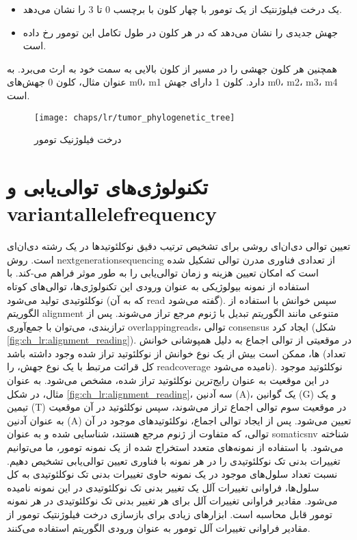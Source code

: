 \begin{itemize}
	\item یک درخت فیلوژنتیک از یک تومور با چهار کلون با برچسب 0 تا 3  را نشان می‌دهد.
	\item جهش جدیدی را نشان می‌دهد که در هر کلون در طول تکامل این تومور رخ داده است.
\end{itemize}

 همچنین هر کلون جهشی را در مسیر از کلون بالایی به سمت خود به ارث می‌برد. به عنوان مثال، کلون 0 جهش‌های m0، m1 دارد. کلون 1 دارای جهش m0، m2، m3، m4 است.
 
\begin{figure}[!ht]
	\centerline{\texttt{[image: chaps/lr/tumor\_phylogenetic\_tree]}}
	\caption{درخت فیلوژنیک تومور}
	\label{fig:ch_lr:tumor_phylogenetic_tree}
\end{figure}


\section{تکنولوژی‌های توالی‌یابی و \gls{variantallelefrequency}}




تعیین توالی دی‌ان‌ای روشی برای تشخیص ترتیب دقیق نوکلئوتیدها در یک رشته دی‌ان‌ای است. روش \gls{nextgenerationsequencing}  از تعدادی فناوری مدرن توالی تشکیل شده است که امکان تعیین هزینه و زمان توالی‌یابی را به طور موثر فراهم می-کند. با استفاده از نمونه بیولوژیکی به عنوان ورودی این تکنولوژی‌ها، توالی‌های کوتاه نوکلئوتیدی تولید می‌شود (که به آن \gls{read}  گفته می‌شود). سپس خوانش با استفاده از الگوریتم \gls{alignment}  متنوعی مانند الگوریتم تبدیل  با ژنوم مرجع تراز می‌شوند. پس از ترازبندی، می‌توان با جمع‌آوری \glspl{overlappingread}،  توالی \gls{consensus}  ایجاد کرد (شکل \ref{fig:ch_lr:alignment_reading}). در موقعیتی از توالی اجماع به دلیل همپوشانی خوانش ها، ممکن است بیش از یک نوع خوانش از نوکلئوتید تراز شده وجود داشته باشد (تعداد کل قرائت مرتبط با یک نوع جهش، را \gls{readcoverage}  نامیده می‌شود). نوکلئوتید موجود در این موقعیت به عنوان رایج‌ترین نوکلئوتید تراز شده، مشخص می‌شود. به عنوان مثال، در شکل \ref{fig:ch_lr:alignment_reading}، سه آدنین (A)، یک گوانین (G) و یک تیمین (T)  در موقعیت سوم توالی اجماع تراز می‌شوند، سپس نوکلئوتید در آن موقعیت به عنوان آدنین (A) تعیین می‌شود. پس از ایجاد توالی اجماع، نوکلئوتیدهای موجود در آن توالی، که متفاوت از ژنوم مرجع هستند، شناسایی شده و به عنوان \gls{somaticsnv}  شناخته می‌شود. با استفاده از نمونه‌های متعدد استخراج شده از یک نمونه تومور، ما می‌توانیم تغییرات بدنی تک نوکلئوتیدی را در هر نمونه با فناوری تعیین توالی‌یابی تشخیص دهیم. نسبت تعداد سلول‌های موجود در یک نمونه حاوی تغییرات بدنی تک نوکلئوتیدی به کل سلول‌ها، فراوانی تغییرات آلل یک تغییر بدنی تک نوکلئوتیدی در این نمونه نامیده می‌شود. مقادیر فراوانی تغییرات آلل برای هر تغییر بدنی تک نوکلئوتیدی  در هر نمونه تومور قابل محاسبه است. ابزارهای زیادی برای بازسازی درخت فیلوژنتیک تومور از مقادیر فراوانی تغییرات آلل تومور به عنوان ورودی الگوریتم استفاده می‌کنند.



